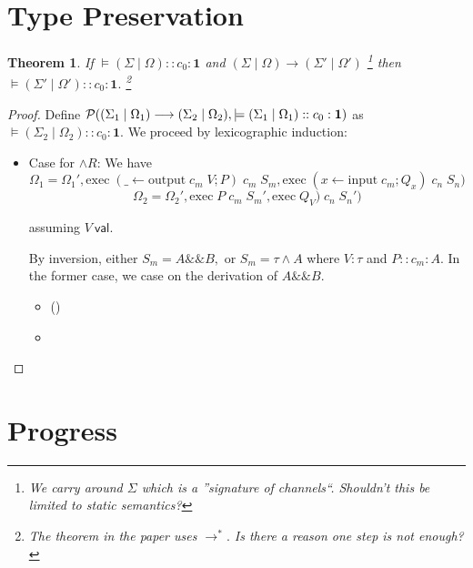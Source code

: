\documentclass[11pt]{article}
\theoremstyle{plain}
\newtheorem{thm}{Theorem}[section]
\theoremstyle{definition}
\theoremstyle{remark}
\DeclarePairedDelimiter\parens{(}{)}             %
\newcommand\intersect{\mathbin{\&\&}}
\newcommand\tout[2]{\_ \leftarrow \mathrm{output}\;#1\;#2}
\newcommand\tin[2]{#1 \leftarrow \mathrm{input}\;#2}
\newcommand\tseq[2]{#1 ; #2}
\newcommand\terminate{\mathbf{1}}
\newcommand{\val}[1]{\ensuremath{{#1}~\mathsf{val}}}
\newcommand\typeProc[3]{#1 :: #2 : #3}
\newcommand\exec[3]{\mathrm{exec}\;{#1}\;{#2}\;{#3}}
\newcommand\steps{\longrightarrow}
\newcommand\valid[4]{\models \typeProc{(#1 \mid #2)}{#3}{#4}}
\newcommand\pred[1]{\mathcal{P}\parens*{#1}}
\begin{document}
\section{Type Preservation}
\begin{thm}
If $\valid{\Sigma}{\Omega}{c_0}{\terminate}$ and $(\Sigma \mid \Omega) \steps (\Sigma' \mid \Omega')$%
\footnote{We carry around $\Sigma$ which is a ''signature of channels``. Shouldn't this be limited to static semantics?} then $\valid{\Sigma'}{\Omega'}{c_0}{\terminate}.$%
\footnote{The theorem in the paper uses $\steps^*.$ Is there a reason one step is not enough?}
\end{thm}
\begin{proof}
Define $\pred{(\Sigma_1 \mid \Omega_1) \steps (\Sigma_2 \mid \Omega_2), \valid{\Sigma_1}{\Omega_1}{c_0}{\terminate}}$ as $\valid{\Sigma_2}{\Omega_2}{c_0}{\terminate}.$ We proceed by lexicographic induction:

\begin{itemize}
	\item Case for $\wedge R$: We have
	\[\Omega_1 = \Omega_1', \exec{(\tseq{\tout{c_m}{V}}{P})}{c_m}{S_m}, \exec{(\tseq{\tin{x}{c_m}}{Q_x})}{c_n}{S_n})\]
	\[ \Omega_2 = \Omega_2', \exec{P}{c_m}{S_m'}, \exec{Q_V)}{c_n}{S_n'}) \]
	
	assuming $\val V.$
	
	By inversion, either $S_m = A \intersect B,$ or $S_m = \tau \wedge A$ where $V : \tau$ and $\typeProc{P}{c_m}{A}.$ In the former case, we case on the derivation of $A \intersect B.$
	
	\begin{itemize}
		\item ()
		\item
	\end{itemize} 
	
\end{itemize}
\end{proof}

\section{Progress}
\end{document}
